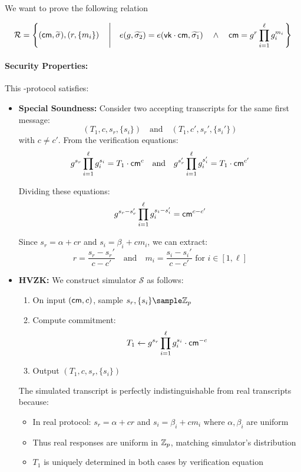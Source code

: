 We want to prove the following relation

    \[
    \mathcal{R} = \left\{(\mathsf{cm}, \widetilde{\sigma}), (r, \{m_i\}) \quad \left| \quad
    \begin{aligned}
        e(g, \widetilde{\sigma_2}) = e(\mathsf{vk} \cdot \mathsf{cm},\widetilde{\sigma_1}) \quad \wedge \quad
        \mathsf{cm} = g^r \prod_{i=1}^\ell g_i^{m_i} \\
    \end{aligned}\right.\right\}
    \]



\paragraph{Security Properties:}
This -protocol satisfies:

\begin{itemize}
    \item \textbf{Special Soundness:} 
    Consider two accepting transcripts for the same first message:
    \[
    (T_1, c, s_r, \{s_i\}) \quad \text{and} \quad (T_1, c', s_r', \{s_i'\})
    \]
    with $c \neq c'$. From the verification equations:
    \[
    g^{s_r}\prod_{i=1}^\ell g_i^{s_i} = T_1 \cdot \mathsf{cm}^c \quad \text{and} \quad
    g^{s_r'}\prod_{i=1}^\ell g_i^{s_i'} = T_1 \cdot \mathsf{cm}^{c'}
    \]
    
    Dividing these equations:
    \[
    g^{s_r - s_r'}\prod_{i=1}^\ell g_i^{s_i - s_i'} = \mathsf{cm}^{c-c'}
    \]
    
    Since $s_r = \alpha + cr$ and $s_i = \beta_i + cm_i$, we can extract:
    \[
    r = \frac{s_r - s_r'}{c - c'} \quad \text{and} \quad
    m_i = \frac{s_i - s_i'}{c - c'} \text{ for } i \in [1,\ell]
    \]
    
    \item \textbf{HVZK:} We construct simulator $\mathcal{S}$ as follows:
    \begin{enumerate}
        \item On input $(\mathsf{cm}, c)$, sample $s_r, \{s_i\} \sample \Z_p$
        \item Compute commitment:
        \[
            T_1 \gets g^{s_r}\prod_{i=1}^\ell g_i^{s_i} \cdot \mathsf{cm}^{-c}
        \]
        \item Output $(T_1, c, s_r, \{s_i\})$
    \end{enumerate}
    
    The simulated transcript is perfectly indistinguishable from real transcripts because:
    \begin{itemize}
        \item In real protocol: $s_r = \alpha + cr$ and $s_i = \beta_i + cm_i$ where $\alpha, \beta_i$ are uniform
        \item Thus real responses are uniform in $\mathbb{Z}_p$, matching simulator's distribution
        \item $T_1$ is uniquely determined in both cases by verification equation
    \end{itemize}
\end{itemize}






